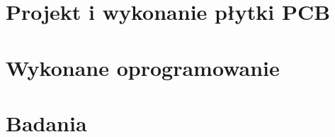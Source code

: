 \documentclass[10pt, a4paper]{article}
\begin{document}
\section{Projekt i wykonanie płytki PCB}
\label{sec:PCB}

\section{Wykonane oprogramowanie}
\label{sec:program}

\section{Badania}
\label{sec:badania}
\end{document}
